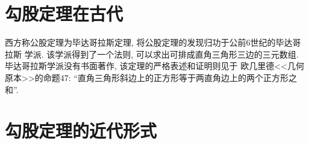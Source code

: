 \documentclass{article}
\begin{document}
\begin{CJK}{UTF8}{gkai}

\section{勾股定理在古代}
西方称公股定理为毕达哥拉斯定理, 将公股定理的发现归功于公前6世纪的毕达哥拉斯
学派. 该学派得到了一个法则, 可以求出可排成直角三角形三边的三元数组.
毕达哥拉斯学派没有书面著作, 该定理的严格表述和证明则见于
欧几里德<<几何原本>>的命题47: ``直角三角形斜边上的正方形等于两直角边上的两个正方形之和''.
\section{勾股定理的近代形式}
\end{CJK}
\end{document}
